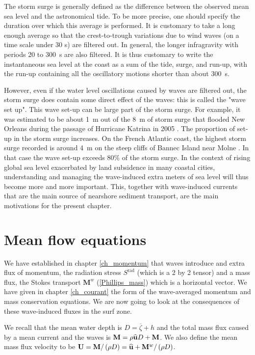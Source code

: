 The storm surge is generally defined as the difference between the observed mean sea level and the astronomical tide. To be more precise, one should specify the duration over which this average is performed. It is customary to take a long enough average so that the crest-to-trough variations due to wind waves (on a time scale under 30 s) are filtered out. In general, the longer infragravity with periods 20 to 300~s are also filtered. It is thus customary to write the instantaneous sea level at the coast as a sum of the tide, surge, and run-up, with the run-up containing all the oscillatory motions shorter than about 300~s. 

However, even if the water level oscillations caused by waves are filtered out, the storm surge does contain some direct effect of the waves: this is called the "wave set up". This wave set-up can be large part of the storm surge. For example, it was estimated to be about 1~m out of the 8~m of storm surge that flooded New Orleans during the passage of Hurricane Katrina in 2005  \citep{Resio&Westerink2008}. The proportion of set-up in the storm surge increases. On the French Atlantic coast, the highest storm surge recorded is around 4~m on the steep cliffs of Bannec Island near Molne \citep{Ardhuin&Magne2010,Sheremet&al.2014}. In that case the wave set-up exceeds 80\% of the storm surge. In the context of rising global sea level exacerbated by land subsidence in many coastal cities, understanding and managing the wave-induced extra meters of sea level will thus become more and more important. This, together with wave-induced currents that are the main source of nearshore sediment transport, are the main motivations for the present chapter. 

\section{Mean flow equations}
We have established in chapter \ref{ch_momentum} that waves introduce and extra flux of momentum, the radiation stress $S^{\mathrm{rad}}$ (which is a 2 by 2 tensor) and a mass flux, the Stokes transport ${\mathbf M^w}$ (\ref{Phillips_mass}) which is a horizontal vector. We have given in chapter \ref{ch_courant} the form of the wave-averaged momentum and mass conservation equations. We are now going to look at the consequences of these wave-induced fluxes in the surf zone. 

We recall  that the mean water depth is 
$D=\overline{\zeta}+h$ and the total mass flux caused by a mean current and the waves is  ${\mathbf M}=\rho
{\mathbf {\widehat{u}}} D +{\mathbf M}$. We also define the mean mass flux velocity to be  ${\mathbf U}={\mathbf
M}/\left(\rho D\right) = {\mathbf {\widehat{u}}}+{\mathbf M^w}/\left(\rho
D\right)$. 

